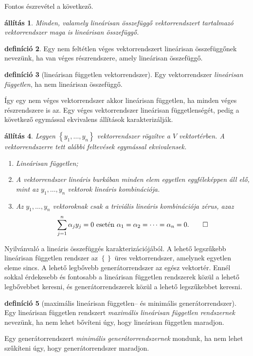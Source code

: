\documentclass[9pt, a4paper, showtrims]{memoir}
\makeatletter
\renewenvironment{proof}[1][\proofname]
    {\par\pushQED{\qed}%
    \normalfont \topsep6\p@\@plus6\p@\relax
    \trivlist
    \item[\hskip\labelsep
        \itshape
    #1\@addpunct{:}]\ignorespaces}
    {\popQED\endtrivlist\@endpefalse}
\theoremstyle{plain}
\newtheorem{proposition}{állítás}[chapter]
\theoremstyle{remark}
\theoremstyle{definition}
\newtheorem{definition}[proposition]{definíció}
\makeatother
\begin{document}
Fontos észrevétel a következő.
\begin{proposition}
    Minden, 
    valamely lineárisan összefüggő vektorrendszert tartalmazó vektorrendszer maga is lineárisan összefüggő.
\end{proposition}
\begin{definition}
    Egy nem feltétlen véges vektorrendszert lineárisan összefüggőnek nevezünk,
    ha van véges részrendszere, amely lineárisan összefüggő.
\end{definition}
\begin{definition}[lineárisan független vektorrendszer]
    Egy vektorrendszer \emph{lineárisan független}, ha nem lineárisan összefüggő.
\end{definition}
Így egy nem véges vektorrendszer akkor lineárisan független, ha minden véges részrendszere is az.
Egy véges vektorrendszer lineárisan függetlenségét, pedig a következő egymással ekvivalens állítások karakterizálják.
\begin{proposition}
    Legyen $\left\{ y_1,\dots,y_n \right\}$ vektorrendszer rögzítve a $V$ vektortérben.
    A vektorrendszerre tett alábbi feltevések egymással ekvivalensek.
    \begin{enumerate}
        \item Lineárisan független;
        \item A vektorrendszer lineáris burkában minden elem egyetlen egyféleképpen áll elő,
            mint az $y_1,\dots,y_n$ vektorok lineáris kombinációja.
        \item Az $y_1,\dots,y_n$ vektoroknak csak a \emph{triviális lineáris kombinációja} zérus,
            azaz
            \[
                \sum_{j=1}^n\alpha_jy_j=0\text{ esetén }\alpha_1=\alpha_2=\dots=\alpha_n=0.\qedhere
            \]
    \end{enumerate}
\end{proposition}
\begin{proof}
    Nyilvánvaló a lineáris összefüggés karakterizációjából.
\end{proof}
A lehető legszűkebb lineárisan független rendszer az $\left\{  \right\}$ üres vektorrendszer,
amelynek egyetlen eleme sincs.
A lehető legbővebb generátorrendszer az egész vektortér. 
Ennél sokkal érdekesebb és fontosabb a lineárisan független rendszerek közül a lehető legbővebbet keresni,
és generátorrendszerek közül a lehető legszűkebbet keresni.
\begin{definition}[maximális lineárisan független-- és minimális generátorrendszer]
    Egy lineárisan független rendszert \emph{maximális lineárisan független rendszernek} nevezünk,
    ha nem lehet bővíteni úgy, hogy lineárisan független maradjon.

    Egy generátorrendszert \emph{minimális generátorrendszernek} mondunk, ha nem lehet szűkíteni úgy,
    hogy generátorrendszer maradjon.
\end{definition}
\end{document}

